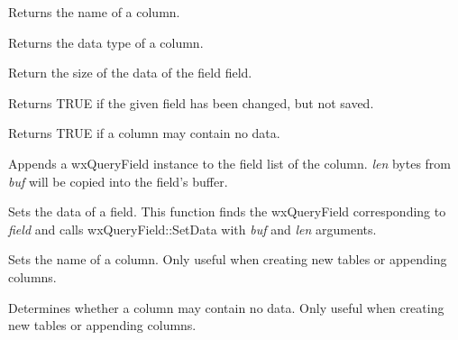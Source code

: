 
Returns the name of a column.
  


Returns the data type of a column.



Return the size of the data of the field field.



Returns TRUE if the given field has been changed, but not saved.


  
Returns TRUE if a column may contain no data.



Appends a wxQueryField instance to the field list of the column. {\it len} bytes from\rtfsp
{\it buf} will be copied into the field's buffer.



Sets the data of a field. This function finds the wxQueryField corresponding to\rtfsp
{\it field} and calls wxQueryField::SetData with {\it buf} and {\it len} arguments.



Sets the name of a column. Only useful when creating new tables or
appending columns.
 


Determines whether a column may contain no data. Only useful when creating new tables or
appending columns.



